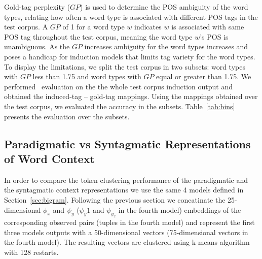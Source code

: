 Gold-tag perplexity ($GP$) is used to determine the POS ambiguity of
the word types, relating how often a word type is associated with
different POS tags in the test corpus.  A $GP$ of 1 for a word type
$w$ indicates $w$ is associated with same POS tag throughout the test
corpus, meaning the word type $w$'s POS is unambiguous.  As the $GP$
increases ambiguity for the word types increases and poses a handicap
for induction models that limits tag variety for the word types.  To
display the limitations, we split the test corpus in two subsets: word
types with $GP$ less than 1.75 and word types with $GP$ equal or greater
than 1.75.  We performed \mto\ evaluation on the the whole test corpus
induction output and obtained the induced-tag -- gold-tag
mappings. Using the mappings obtained over the test corpus, we
evaluated the accuracy in the subsets.  Table~\ref{tab:bins} presents
the evaluation over the subsets.

\subsection{Paradigmatic vs Syntagmatic Representations of Word Context}

In order to compare the token clustering performance of the
paradigmatic and the syntagmatic context representations we use the
same 4 models defined in Section~\ref{sec:bigram}.  Following the
previous section we concatinate the 25-dimensional $\phi_x$ and
$\psi_y$ ($\psi_y1$ and $\psi_y_2$ in the fourth model) embeddings of
the corresponding observed pairs (tuples in the fourth model) and
represent the first three models outputs with a 50-dimensional vectors
(75-dimensional vectors in the fourth model).  The resulting vectors
are clustered using k-means algorithm with 128 restarts.

